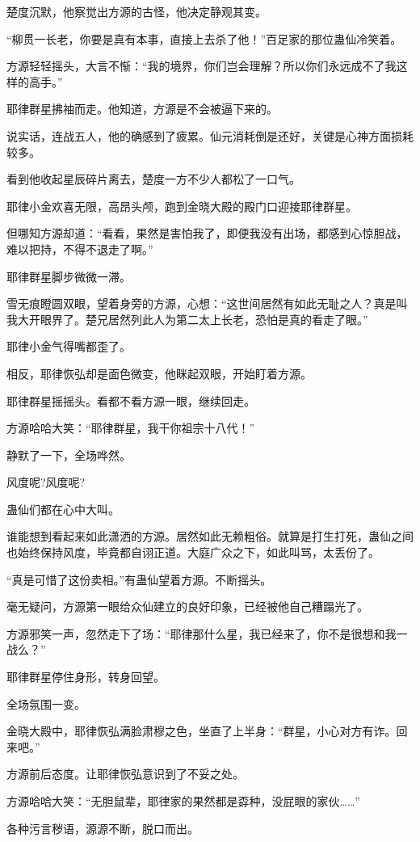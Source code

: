 \begin{this_body}
楚度沉默，他察觉出方源的古怪，他决定静观其变。

“柳贯一长老，你要是真有本事，直接上去杀了他！”百足家的那位蛊仙冷笑着。

方源轻轻摇头，大言不惭：“我的境界，你们岂会理解？所以你们永远成不了我这样的高手。”

耶律群星拂袖而走。他知道，方源是不会被逼下来的。

说实话，连战五人，他的确感到了疲累。仙元消耗倒是还好，关键是心神方面损耗较多。

看到他收起星辰碎片离去，楚度一方不少人都松了一口气。

耶律小金欢喜无限，高昂头颅，跑到金晓大殿的殿门口迎接耶律群星。

但哪知方源却道：“看看，果然是害怕我了，即便我没有出场，都感到心惊胆战，难以把持，不得不退走了啊。”

耶律群星脚步微微一滞。

雪无痕瞪圆双眼，望着身旁的方源，心想：“这世间居然有如此无耻之人？真是叫我大开眼界了。楚兄居然列此人为第二太上长老，恐怕是真的看走了眼。”

耶律小金气得嘴都歪了。

相反，耶律恢弘却是面色微变，他眯起双眼，开始盯着方源。

耶律群星摇摇头。看都不看方源一眼，继续回走。

方源哈哈大笑：“耶律群星，我干你祖宗十八代！”

静默了一下，全场哗然。

风度呢?风度呢?

蛊仙们都在心中大叫。

谁能想到看起来如此潇洒的方源。居然如此无赖粗俗。就算是打生打死，蛊仙之间也始终保持风度，毕竟都自诩正道。大庭广众之下，如此叫骂，太丢份了。

“真是可惜了这份卖相。”有蛊仙望着方源。不断摇头。

毫无疑问，方源第一眼给众仙建立的良好印象，已经被他自己糟蹋光了。

方源邪笑一声，忽然走下了场：“耶律那什么星，我已经来了，你不是很想和我一战么？”

耶律群星停住身形，转身回望。

全场氛围一变。

金晓大殿中，耶律恢弘满脸肃穆之色，坐直了上半身：“群星，小心对方有诈。回来吧。”

方源前后态度。让耶律恢弘意识到了不妥之处。

方源哈哈大笑：“无胆鼠辈，耶律家的果然都是孬种，没屁眼的家伙……”

各种污言秽语，源源不断，脱口而出。


\end{this_body}
